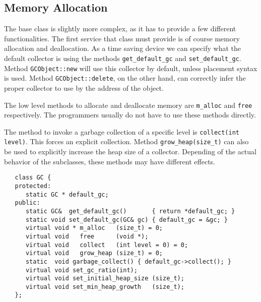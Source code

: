 \subsection{Memory Allocation}

The base class  is slightly more complex, as it has to provide
a few different functionalities.  The first service that class  
must 
provide is of course memory allocation and deallocation.  As a time saving
device we can specify what the default collector is using the methods
\verb|get_default_gc| and \verb|set_default_gc|.  Method \verb|GCObject::new| 
will use this collector by default, unless placement syntax is used.
Method \verb|GCObject::delete|, on the other hand, can correctly infer the 
proper collector to use by the address of the object.

The low level methods to allocate and deallocate memory are \verb|m_alloc|
and \verb|free| respectively.  The programmers usually do not have to
use these methods directly. 

The method to invoke a garbage collection of a specific level is 
\verb|collect(int level)|.  This forces an explicit collection.
Method \verb|grow_heap(size_t)| can also be used to explicitly increase
the heap size of a collector.  Depending of the actual behavior
of the subclasses, these methods may have different effects.

\begin{verbatim}
   class GC {
   protected:
      static GC * default_gc;
   public:
      static GC&  get_default_gc()       { return *default_gc; }
      static void set_default_gc(GC& gc) { default_gc = &gc; }
      virtual void * m_alloc   (size_t) = 0;
      virtual void   free      (void *);
      virtual void   collect   (int level = 0) = 0;
      virtual void   grow_heap (size_t) = 0;
      static  void garbage_collect() { default_gc->collect(); }
      virtual void set_gc_ratio(int);
      virtual void set_initial_heap_size (size_t);
      virtual void set_min_heap_growth   (size_t);
   };
\end{verbatim}


